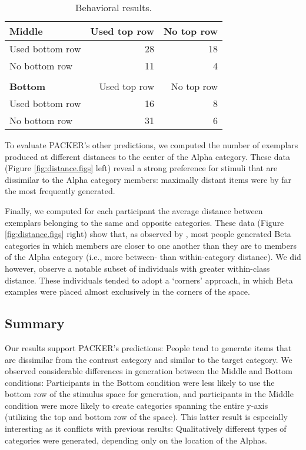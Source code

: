 \documentclass[10pt,letterpaper]{article}
\begin{document}
\begin{table}
\begin{center} 
\caption{Behavioral results.} 
\label{table:subset-table} 
\vskip 0.12in
\begin{tabular}{ l r r}
    \textbf{Middle}         & Used top row & No top row \\
    \hline
    Used bottom row       &  28 & 18  \\
    No bottom row          &  11 &  4  \\
    \\
    \textbf{Bottom}         & Used top row & No top row \\
    \hline
    Used bottom row        & 16 & 8 \\
    No bottom row          & 31 & 6 \\
\end{tabular}
\end{center} 
\end{table}

To evaluate PACKER's other predictions, we computed the number of exemplars produced at different distances to the center of the Alpha category. These data (Figure \ref{fig:distance.figs} left) reveal a strong preference for stimuli that are dissimilar to the Alpha category members: maximally distant items were by far the most frequently generated. 

Finally, we computed for each participant the average distance between exemplars belonging to the same and opposite categories. These data (Figure \ref{fig:distance.figs} right) show that, as observed by \citet{ward1994structured}, most people generated Beta categories in which members are closer to one another than they are to members of the Alpha category (i.e., more between- than within-category distance). We did however, observe a notable subset of individuals with greater within-class distance. These individuals tended to adopt a `corners' approach, in which Beta examples were placed almost exclusively in the corners of the space.


\subsection{Summary}

Our results support PACKER's predictions: People tend to generate items that are dissimilar from the contrast category and similar to the target category. We observed considerable differences in generation between the Middle and Bottom conditions: Participants in the Bottom condition were less likely to use the bottom row of the stimulus space for generation, and participants in the Middle condition were more likely to create categories spanning the entire y-axis (utilizing the top and bottom row of the space). This latter result is especially interesting as it conflicts with previous results: Qualitatively different types of categories were generated, depending only on the location of the Alphas. 
\end{document}
